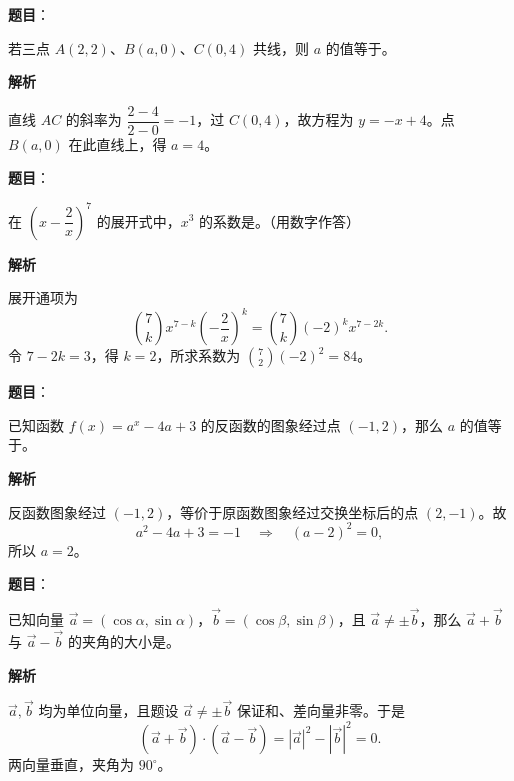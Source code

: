 \begin{answer}

\textbf{题目}：

若三点 $A(2,2)$、$B(a,0)$、$C(0,4)$ 共线，则 $a$ 的值等于\gkblank{}。

\textbf{解析}

直线 $AC$ 的斜率为 $\dfrac{2-4}{2-0}=-1$，过 $C(0,4)$，故方程为 $y=-x+4$。点 $B(a,0)$ 在此直线上，得 $a=4$。


\end{answer}
\begin{answer}

\textbf{题目}：

在 $\left(x-\dfrac2x\right)^7$ 的展开式中，$x^3$ 的系数是\gkblank{}。（用数字作答）

\textbf{解析}

展开通项为
\nopagebreak[4]
\[
\binom7k x^{7-k}\left(-\frac2x\right)^k
=\binom7k(-2)^k x^{7-2k}.
\]
令 $7-2k=3$，得 $k=2$，所求系数为 $\binom72(-2)^2=84$。


\end{answer}
\begin{answer}

\textbf{题目}：

已知函数 $f(x)=a^x-4a+3$ 的反函数的图象经过点 $(-1,2)$，那么 $a$ 的值等于\gkblank{}。

\textbf{解析}

反函数图象经过 $(-1,2)$，等价于原函数图象经过交换坐标后的点 $(2,-1)$。故
\nopagebreak[4]
\[
a^2-4a+3=-1\quad\Longrightarrow\quad(a-2)^2=0,
\]
所以 $a=2$。


\end{answer}
\begin{answer}

\textbf{题目}：

已知向量 $\vec a=(\cos\alpha,\sin\alpha)$，$\vec b=(\cos\beta,\sin\beta)$，且 $\vec a\ne\pm\vec b$，那么 $\vec a+\vec b$ 与 $\vec a-\vec b$ 的夹角的大小是\gkblank{}。

\textbf{解析}

$\vec a,\vec b$ 均为单位向量，且题设 $\vec a\ne\pm\vec b$ 保证和、差向量非零。于是
\nopagebreak[4]
\[
(\vec a+\vec b)\cdot(\vec a-\vec b)
=|\vec a|^2-|\vec b|^2=0.
\]
两向量垂直，夹角为 $90^\circ$。


\end{answer}
